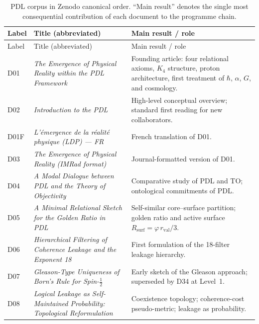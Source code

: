 \documentclass[11pt,a4paper]{article}
\theoremstyle{plain}
\theoremstyle{definition}
\theoremstyle{remark}
\newcommand{\Kfour}{K_4}
\newcommand{\rval}{r_{\mathrm{val}}}
\newcommand{\Rsurf}{R_{\mathrm{surf}}}
\begin{document}
\begin{longtable}{@{}L{1.3cm}L{3.8cm}L{8.0cm}@{}}
\caption{PDL corpus in Zenodo canonical order. ``Main result'' denotes the single most consequential contribution of each document to the programme chain.}
\label{tab:documents}\\
\toprule
Label & Title (abbreviated) & Main result / role \\
\midrule
\endfirsthead
\toprule
Label & Title (abbreviated) & Main result / role \\
\midrule
\endhead
\bottomrule
\endfoot

D01 & \textit{The Emergence of Physical Reality within the PDL Framework}~\citep{D01} & Founding article: four relational axioms, $\Kfour$ structure, proton architecture, first treatment of $\hbar$, $\alpha$, $G$, and cosmology. \\[0.3em]

D02 & \textit{Introduction to the PDL}~\citep{D02} & High-level conceptual overview; standard first reading for new collaborators. \\[0.3em]

D01F & \textit{L'\'emergence de la r\'ealit\'e physique (LDP) — FR}~\citep{D01F} & French translation of D01. \\[0.3em]

D03 & \textit{The Emergence of Physical Reality (IMRad format)}~\citep{D03} & Journal-formatted version of D01. \\[0.3em]

D04 & \textit{A Modal Dialogue between PDL and the Theory of Objectivity}~\citep{D04} & Comparative study of PDL and TO; ontological commitments of PDL. \\[0.3em]

D05 & \textit{A Minimal Relational Sketch for the Golden Ratio in PDL}~\citep{D05} & Self-similar core--surface partition; golden ratio and active surface $\Rsurf = \varphi\,\rval/3$. \\[0.3em]

D06 & \textit{Hierarchical Filtering of Coherence Leakage and the Exponent 18}~\citep{D06} & First formulation of the 18-filter leakage hierarchy. \\[0.3em]

D07 & \textit{Gleason-Type Uniqueness of Born's Rule for Spin-$\tfrac{1}{2}$}~\citep{D07} & Early sketch of the Gleason approach; superseded by D34 at Level~1. \\[0.3em]

D08 & \textit{Logical Leakage as Self-Maintained Probability: Topological Reformulation}~\citep{D08} & Coexistence topology; coherence-cost pseudo-metric; leakage as probability. \\[0.3em]


\end{longtable}
\end{document}
